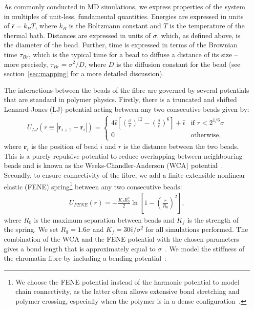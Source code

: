 \documentclass[12pt]{article}
\begin{document}
As commonly conducted in MD simulations, we express properties of the system in multiples of unit-less, fundamental quantities. Energies are expressed in units of  $\hat{\epsilon} = k_BT$, where $k_B$ is the Boltzmann constant and $T$ is the temperature of the thermal bath. Distances are expressed in units of $\sigma$, which, as defined above, is the diameter of the bead. Further, time is expressed in terms of the Brownian time $\tau_{Br}$, which is the typical time for a bead to diffuse a distance of its size -- more precisely, $\tau_{Br} = \sigma^2/D$, where $D$ is the diffusion constant for the bead (see section~\ref{sec:mapping} for a more detailed discussion).

The interactions between the beads of the fibre are governed by several potentials that are standard in polymer physics. Firstly, there is a truncated and shifted Lennard-Jones (LJ) potential acting between any two consecutive beads given by:
\begin{eqnarray}
\label{eqn:WCA}
U_{LJ}(r \equiv |\bm{r}_{i+1} - \bm{r}_i|) = \left\{ 
	\begin{array}{ll}
		4\hat{\epsilon} \left[\left(\frac{\sigma}{r}\right)^{12} - \left(\frac{\sigma}{r}\right)^6\right] + \hat{\epsilon} & \textrm{if $r < 2^{1/6}\sigma$}\\
		0 & \textrm{otherwise},
	\end{array}
\right.
\end{eqnarray}
where $\bm{r}_i$ is the position of bead $i$ and $r$ is the distance between the two beads. This is a purely repulsive potential to reduce overlapping between neighbouring beads and is known as the Weeks-Chandler-Anderson (WCA) potential~\cite{weeks1971}. Secondly, to ensure connectivity of the fibre, we add a finite extensible nonlinear elastic (FENE) spring\footnote{We choose the FENE potential instead of the harmonic potential to model chain connectivity, as the latter often allows extensive bond stretching and polymer crossing, especially when the polymer is in a dense configuration~\cite{michielettoThesis}.} between any two consecutive beads:
\begin{eqnarray}
U_{FENE}(r) = - \frac{K_fR_0^2}{2}\ln\left[1-\left(\frac{r}{R_0}\right)^2\right],
\end{eqnarray}
where $R_0$ is the maximum separation between beads and $K_f$ is the strength of the spring. We set $R_0 = 1.6\sigma$ and $K_f = 30\hat{\epsilon}/\sigma^2$ for all simulations performed. The combination of the WCA and the FENE potential with the chosen parameters gives a bond length that is approximately equal to $ \sigma$~\cite{brackley2013}. We model the stiffness of the chromatin fibre by including a bending potential~\cite{kremer1990}:
\end{document}
